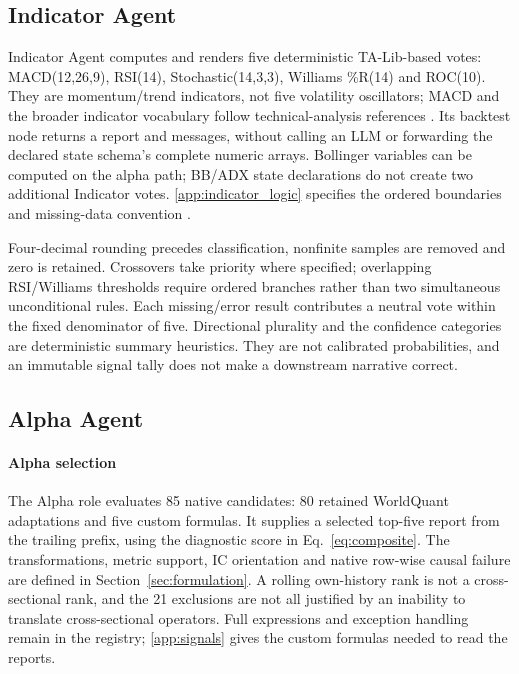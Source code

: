 \subsection{Indicator Agent}
Indicator Agent computes and renders five deterministic TA-Lib-based votes: MACD(12,26,9), RSI(14), Stochastic(14,3,3), Williams \%R(14) and ROC(10). They are momentum/trend indicators, not five volatility oscillators; MACD and the broader indicator vocabulary follow technical-analysis references \cite{appel2005technical,murphy1999technical}. Its backtest node returns a report and messages, without calling an LLM or forwarding the declared state schema's complete numeric arrays. Bollinger variables can be computed on the alpha path; BB/ADX state declarations do not create two additional Indicator votes. \ref{app:indicator_logic} specifies the ordered boundaries and missing-data convention \cite{talib_rsi_docs,talib_willr_docs}.

Four-decimal rounding precedes classification, nonfinite samples are removed and zero is retained. Crossovers take priority where specified; overlapping RSI/Williams thresholds require ordered branches rather than two simultaneous unconditional rules. Each missing/error result contributes a neutral vote within the fixed denominator of five. Directional plurality and the confidence categories are deterministic summary heuristics. They are not calibrated probabilities, and an immutable signal tally does not make a downstream narrative correct.

\subsection{Alpha Agent}
\paragraph{Alpha selection}
The Alpha role evaluates 85 native candidates: 80 retained WorldQuant adaptations and five custom formulas. It supplies a selected top-five report from the trailing prefix, using the diagnostic score in Eq.~\ref{eq:composite}. The transformations, metric support, IC orientation and native row-wise causal failure are defined in Section~\ref{sec:formulation}. A rolling own-history rank is not a cross-sectional rank, and the 21 exclusions are not all justified by an inability to translate cross-sectional operators. Full expressions and exception handling remain in the registry; \ref{app:signals} gives the custom formulas needed to read the reports.

